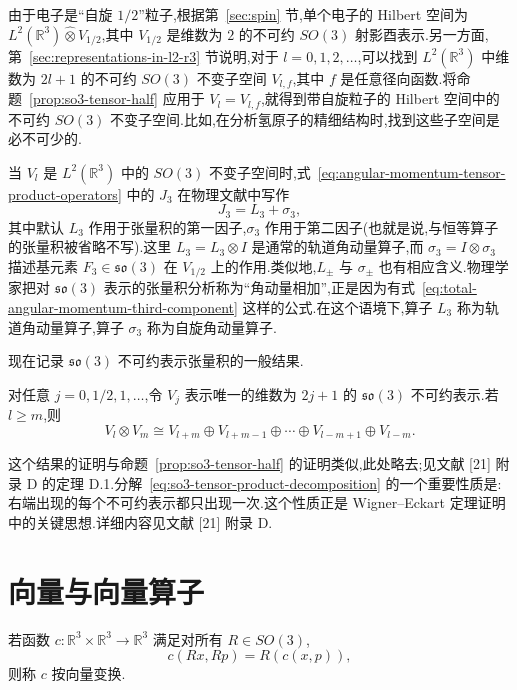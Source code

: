 由于电子是“自旋 $1/2$”粒子,根据第~\ref{sec:spin} 节,单个电子的 Hilbert 空间为 $L^2(\mathbb R^3)\widehat\otimes V_{1/2}$,其中 $V_{1/2}$ 是维数为 $2$ 的不可约 $SO(3)$ 射影酉表示.另一方面,第~\ref{sec:representations-in-l2-r3} 节说明,对于 $l=0,1,2,\ldots$,可以找到 $L^2(\mathbb R^3)$ 中维数为 $2l+1$ 的不可约 $SO(3)$ 不变子空间 $V_{l,f}$,其中 $f$ 是任意径向函数.将命题~\ref{prop:so3-tensor-half} 应用于 $V_l=V_{l,f}$,就得到带自旋粒子的 Hilbert 空间中的不可约 $SO(3)$ 不变子空间.比如,在分析氢原子的精细结构时,找到这些子空间是必不可少的.

当 $V_l$ 是 $L^2(\mathbb R^3)$ 中的 $SO(3)$ 不变子空间时,式~\eqref{eq:angular-momentum-tensor-product-operators} 中的 $J_3$ 在物理文献中写作
\[
 J_3=L_3+\sigma_3,
\label{eq:total-angular-momentum-third-component}
\]
其中默认 $L_3$ 作用于张量积的第一因子,$\sigma_3$ 作用于第二因子(也就是说,与恒等算子的张量积被省略不写).这里 $L_3=L_3\otimes I$ 是通常的轨道角动量算子,而 $\sigma_3=I\otimes\sigma_3$ 描述基元素 $F_3\in\mathfrak{so}(3)$ 在 $V_{1/2}$ 上的作用.类似地,$L_\pm$ 与 $\sigma_\pm$ 也有相应含义.物理学家把对 $\mathfrak{so}(3)$ 表示的张量积分析称为“角动量相加”,正是因为有式~\eqref{eq:total-angular-momentum-third-component} 这样的公式.在这个语境下,算子 $L_3$ 称为轨道角动量算子,算子 $\sigma_3$ 称为自旋角动量算子.

现在记录 $\mathfrak{so}(3)$ 不可约表示张量积的一般结果.

\begin{proposition}\label{prop:so3-tensor-product-decomposition}
对任意 $j=0,1/2,1,\ldots$,令 $V_j$ 表示唯一的维数为 $2j+1$ 的 $\mathfrak{so}(3)$ 不可约表示.若 $l\ge m$,则
\[
 V_l\otimes V_m\cong V_{l+m}\oplus V_{l+m-1}\oplus\cdots\oplus V_{l-m+1}\oplus V_{l-m}.
\label{eq:so3-tensor-product-decomposition}
\]
\end{proposition}

这个结果的证明与命题~\ref{prop:so3-tensor-half} 的证明类似,此处略去;见文献 [21] 附录 D 的定理 D.1.分解~\eqref{eq:so3-tensor-product-decomposition} 的一个重要性质是:右端出现的每个不可约表示都只出现一次.这个性质正是 Wigner--Eckart 定理证明中的关键思想.详细内容见文献 [21] 附录 D.

\section{向量与向量算子}
\label{sec:vectors-vector-operators}

\begin{definition}[按向量变换的函数]\label{def:classical-vector-transform}
若函数 $c:\mathbb R^3\times\mathbb R^3\to\mathbb R^3$ 满足对所有 $R\in SO(3)$,
\[
 c(Rx,Rp)=R(c(x,p)),
\label{eq:classical-vector-transformation}
\]
则称 $c$ 按向量变换.
\end{definition}

